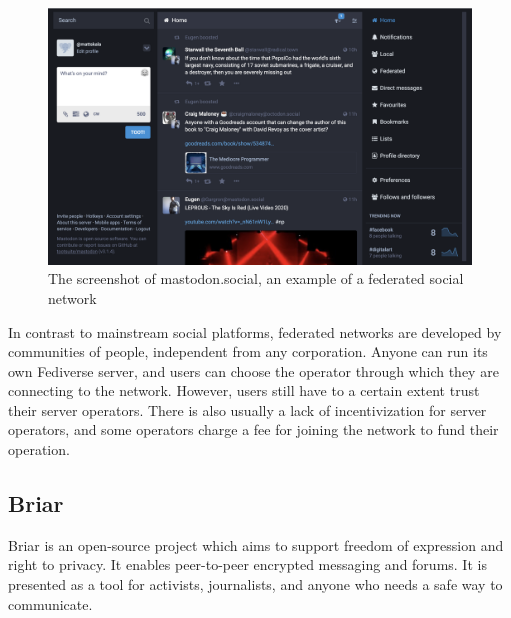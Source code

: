 \begin{figure}
    \centering
    \includegraphics[width=\textwidth]{screens/mastodon}
    \caption{The screenshot of mastodon.social, an example of a federated social network}
    \label{mastodon}
\end{figure}

In contrast to mainstream social platforms, federated networks are developed by communities of people, independent from any corporation. Anyone can run its own Fediverse server, and users can choose the operator through which they are connecting to the network. However, users still have to a certain extent trust their server operators. There is also usually a lack of incentivization for server operators, and some operators charge a fee for joining the network to fund their operation.

\subsection{Briar}


Briar \cite{briar} is an open-source project which aims to support freedom of expression and right to privacy. It enables peer-to-peer encrypted messaging and forums. It is presented as a tool for activists, journalists, and anyone who needs a safe way to communicate.

